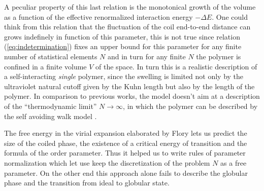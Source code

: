 \documentclass[12pt,a4paper,notitlepage]{article}
\begin{document}
A peculiar property of this last relation is the monotonical growth of
the volume as a function of the effective renormalized interaction
energy $-\Delta E$. One could think from this relation that the
fluctuation of the coil end-to-end distance can grows indefinely in
function of this parameter, this is not true since relation
(\ref{eq:indetermination}) fixes an upper bound for this parameter for
any finite number of statistical elements $N$ and in turn for any
finite $N$ the polymer is confined in a finite volume $V$ of the
space. In turn this is a realistic description of a
self-interacting {\it single} polymer, since the swelling is limited
not only by the ultraviolet natural cutoff given by the Kuhn length
but also by the length of the polymer. In comparison to previous
works\cite{}, the model doesn't aim at a description of the
``thermodynamic limit'' $N \to \infty$, in which the polymer can be
described by the self avoiding walk model \cite{Degennes1979}.

The free energy in the virial expansion elaborated by Flory lets us
predict the size of the coiled phase, the existence of a critical
energy of transition and the formula of the order parameter. Thus it
helped us to write rules of parameter normalization which let use
keep the discretization of the problem $N$ as a free parameter. On the
other end this approach alone fails to describe the globular phase and
the transition from ideal to globular state.



\end{document}
